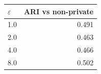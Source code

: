 \begin{tabular}{lr}
\toprule
$\varepsilon$ & ARI vs non-private \\
\midrule
1.0 & 0.491 \\
2.0 & 0.463 \\
4.0 & 0.466 \\
8.0 & 0.502 \\
\bottomrule
\end{tabular}

